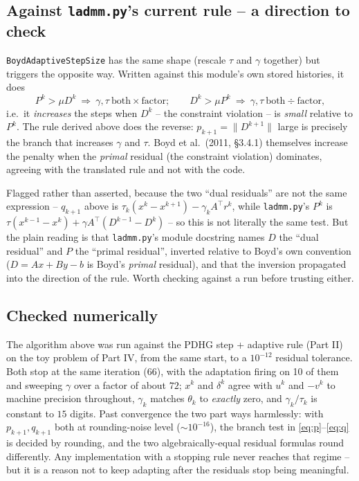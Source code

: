 \documentclass[11pt]{article}
\newcommand{\code}[1]{\texttt{#1}}
\begin{document}
\subsection*{Against \code{ladmm.py}'s current rule -- a direction to check}
\code{BoydAdaptiveStepSize} has the same shape (rescale $\tau$ and $\gamma$
together) but triggers the opposite way. Written against this module's own stored
histories, it does
\[
P^k>\mu D^k\ \Rightarrow\ \gamma,\tau\ \text{both}\times\text{factor};
\qquad
D^k>\mu P^k\ \Rightarrow\ \gamma,\tau\ \text{both}\div\text{factor},
\]
i.e.\ it \emph{increases} the steps when $D^k$ -- the constraint violation -- is
\emph{small} relative to $P^k$. The rule derived above does the reverse:
$p_{k+1}=\|D^{k+1}\|$ large is precisely the branch that increases $\gamma$ and
$\tau$. Boyd et al.\ (2011, \S3.4.1) themselves increase the penalty when the
\emph{primal} residual (the constraint violation) dominates, agreeing with the
translated rule and not with the code.

Flagged rather than asserted, because the two ``dual residuals'' are not the same
expression -- $q_{k+1}$ above is $\tau_k(x^k-x^{k+1})-\gamma_kA^\top r^k$, while
\code{ladmm.py}'s $P^k$ is $\tau(x^{k-1}-x^k)+\gamma A^\top(D^{k-1}-D^k)$ -- so
this is not literally the same test. But the plain reading is that
\code{ladmm.py}'s module docstring names $D$ the ``dual residual'' and $P$ the
``primal residual'', inverted relative to Boyd's own convention ($D=Ax+By-b$ is
Boyd's \emph{primal} residual), and that the inversion propagated into the
direction of the rule. Worth checking against a run before trusting either.

\subsection*{Checked numerically}
The algorithm above was run against the PDHG step + adaptive rule (Part II) on the
toy problem of Part IV, from the same start, to a $10^{-12}$ residual tolerance.
Both stop at the same iteration (66), with the adaptation firing on 10 of them and
sweeping $\gamma$ over a factor of about $72$; $x^k$ and $\delta^k$ agree with
$u^k$ and $-v^k$ to machine precision throughout, $\gamma_k$ matches $\theta_k$
to \emph{exactly} zero, and $\gamma_k/\tau_k$ is constant to $15$ digits. Past
convergence the two part ways harmlessly: with $p_{k+1},q_{k+1}$ both at
rounding-noise level ($\sim10^{-16}$), the branch test in \eqref{eq:p}--\eqref{eq:q}
is decided by rounding, and the two algebraically-equal residual formulas round
differently. Any implementation with a stopping rule never reaches that regime --
but it is a reason not to keep adapting after the residuals stop being meaningful.
\end{document}
